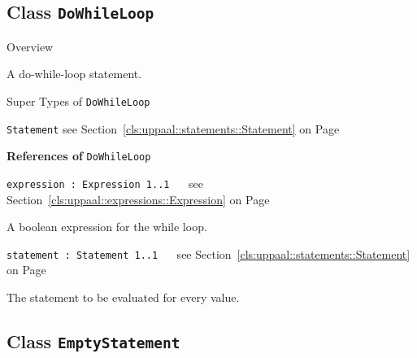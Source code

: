 \subsection{Class \bfseries \texttt{DoWhileLoop}\normalfont}
\label{cls:uppaal::statements::DoWhileLoop} 
	
	\begin{longdescription}
		\item[Overview] 		
				

	

		A do-while-loop statement.		
		\item[Super Types of \texttt{DoWhileLoop}] ~
			\begin{longdescription}
				\item[\texttt{Statement}] see Section~\ref{cls:uppaal::statements::Statement} on Page~\pageref{cls:uppaal::statements::Statement}						\end{longdescription}
		
	
			\item[\textbf{References of} \texttt{DoWhileLoop}] ~
			\begin{longdescription}
	\item[\texttt{expression : Expression 	\symbol{"5B}1..1\symbol{"5D}
}] ~
	see Section~\ref{cls:uppaal::expressions::Expression} on Page~\pageref{cls:uppaal::expressions::Expression}
	
	\nopagebreak
		
				

	

		A boolean expression for the while loop.		
	\item[\texttt{statement : Statement 	\symbol{"5B}1..1\symbol{"5D}
}] ~
	see Section~\ref{cls:uppaal::statements::Statement} on Page~\pageref{cls:uppaal::statements::Statement}
	
	\nopagebreak
		
				

	

		The statement to be evaluated for every value.		
			\end{longdescription}
	
	\end{longdescription}
	

\subsection{Class \bfseries \texttt{EmptyStatement}\normalfont}
\label{cls:uppaal::statements::EmptyStatement} 
	
